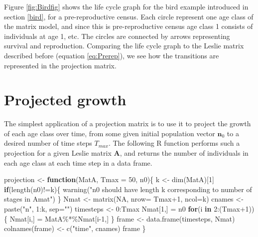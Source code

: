 \documentclass[
]{book}
\newenvironment{Shaded}{\begin{snugshade}}{\end{snugshade}}
\newcommand{\AttributeTok}[1]{\textcolor[rgb]{0.77,0.63,0.00}{#1}}
\newcommand{\ConstantTok}[1]{\textcolor[rgb]{0.00,0.00,0.00}{#1}}
\newcommand{\ControlFlowTok}[1]{\textcolor[rgb]{0.13,0.29,0.53}{\textbf{#1}}}
\newcommand{\DecValTok}[1]{\textcolor[rgb]{0.00,0.00,0.81}{#1}}
\newcommand{\FunctionTok}[1]{\textcolor[rgb]{0.00,0.00,0.00}{#1}}
\newcommand{\NormalTok}[1]{#1}
\newcommand{\OtherTok}[1]{\textcolor[rgb]{0.56,0.35,0.01}{#1}}
\newcommand{\SpecialCharTok}[1]{\textcolor[rgb]{0.00,0.00,0.00}{#1}}
\newcommand{\StringTok}[1]{\textcolor[rgb]{0.31,0.60,0.02}{#1}}
\begin{document}
Figure \ref{fig:Birdfig} shows the life cycle graph for the bird example introduced in section \ref{bird}, for a pre-reproductive census. Each circle represent one age class of the matrix model, and since this is pre-reproductive census age class 1 consists of individuals at age 1, etc. The circles are connected by arrows representing survival and reproduction. Comparing the life cycle graph to the Leslie matrix described before (equation \eqref{eq:Prerep}), we see how the transitions are represented in the projection matrix.

\hypertarget{projected-growth}{%
\section{Projected growth}\label{projected-growth}}

The simplest application of a projection matrix is to use it to project the growth of each age class over time, from some given initial population vector \(\mathbf{n}_0\) to a desired number of time steps \(T_{max}\). The following R function performs such a projection for a given Leslie matrix \(\mathbf{A}\), and returns the number of individuals in each age class at each time step in a data frame.

\begin{Shaded}
\begin{Highlighting}[]
\NormalTok{projection }\OtherTok{\textless{}{-}} \ControlFlowTok{function}\NormalTok{(MatA, }\AttributeTok{Tmax =} \DecValTok{50}\NormalTok{, n0)\{}
\NormalTok{  k }\OtherTok{\textless{}{-}} \FunctionTok{dim}\NormalTok{(MatA)[}\DecValTok{1}\NormalTok{]}
  \ControlFlowTok{if}\NormalTok{(}\FunctionTok{length}\NormalTok{(n0)}\SpecialCharTok{!=}\NormalTok{k)\{}
      \FunctionTok{warning}\NormalTok{(}\StringTok{"n0 should have length k }
\StringTok{              corresponding to number }
\StringTok{              of stages in Amat"}\NormalTok{)}
\NormalTok{      \}}
\NormalTok{  Nmat }\OtherTok{\textless{}{-}} \FunctionTok{matrix}\NormalTok{(}\ConstantTok{NA}\NormalTok{, }\AttributeTok{nrow=}\NormalTok{ Tmax}\SpecialCharTok{+}\DecValTok{1}\NormalTok{, }\AttributeTok{ncol=}\NormalTok{k)}
\NormalTok{  cnames }\OtherTok{\textless{}{-}} \FunctionTok{paste}\NormalTok{(}\StringTok{"n"}\NormalTok{, }\DecValTok{1}\SpecialCharTok{:}\NormalTok{k, }\AttributeTok{sep=}\StringTok{""}\NormalTok{)}
\NormalTok{  timesteps }\OtherTok{\textless{}{-}} \DecValTok{0}\SpecialCharTok{:}\NormalTok{Tmax}
\NormalTok{  Nmat[}\DecValTok{1}\NormalTok{,] }\OtherTok{=}\NormalTok{ n0 }
  \ControlFlowTok{for}\NormalTok{(i }\ControlFlowTok{in} \DecValTok{2}\SpecialCharTok{:}\NormalTok{(Tmax}\SpecialCharTok{+}\DecValTok{1}\NormalTok{))\{  }
\NormalTok{    Nmat[i,] }\OtherTok{=}\NormalTok{ MatA}\SpecialCharTok{\%*\%}\NormalTok{Nmat[i}\DecValTok{{-}1}\NormalTok{,]}
\NormalTok{  \}}
\NormalTok{  frame }\OtherTok{\textless{}{-}} \FunctionTok{data.frame}\NormalTok{(timesteps, Nmat)}
  \FunctionTok{colnames}\NormalTok{(frame) }\OtherTok{\textless{}{-}} \FunctionTok{c}\NormalTok{(}\StringTok{"time"}\NormalTok{, cnames)}
\NormalTok{  frame}
\NormalTok{\}}
\end{Highlighting}
\end{Shaded}
\end{document}
